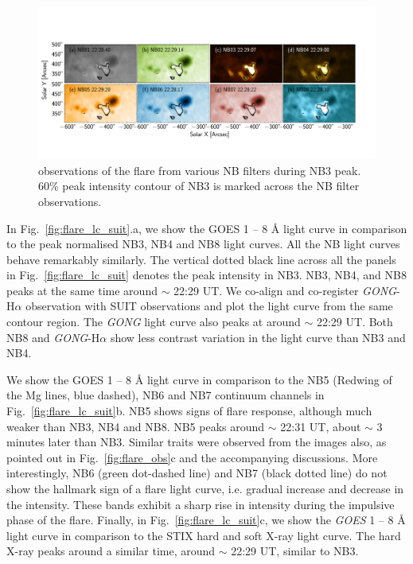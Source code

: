 \begin{figure}
    \centering
    \includegraphics[trim={0.2cm 2.5cm 2cm 4cm},clip,width=\linewidth]{Figures/feb_22nd/suit_roi_nb3_peak.pdf}
    \caption[{\suit} observations of the flare from various NB filters during NB3 peak]{{\suit} observations of the flare from various NB filters during NB3 peak. 60\% peak intensity contour of NB3 is marked across the NB filter observations.}
    \label{fig:flare_nb3_peak}
\end{figure}

In Fig.~\ref{fig:flare_lc_suit}.a, we show the GOES 1 {--} 8 {\AA} light curve in comparison to the peak normalised NB3, NB4 and NB8 light curves. All the NB light curves behave remarkably similarly. The vertical dotted black line across all the panels in Fig.~\ref{fig:flare_lc_suit} denotes the peak intensity in NB3. NB3, NB4, and NB8 peaks at the same time around $\sim$ 22:29 UT. We co-align and co-register {\it GONG}-H$\alpha$ observation with SUIT observations and plot the light curve from the same contour region. The {\it GONG} light curve also peaks at around $\sim$ 22:29 UT. Both NB8 and {\it GONG}-H$\alpha$ show less contrast variation in the light curve than NB3 and NB4.

We show the GOES 1 {--} 8 {\AA} light curve in comparison to the NB5 (Redwing of the Mg lines, blue dashed), NB6 and NB7 continuum channels in Fig.~\ref{fig:flare_lc_suit}b. NB5 shows signs of flare response, although much weaker than NB3, NB4 and NB8. NB5 peaks around $\sim$ 22:31 UT, about $\sim$ 3 minutes later than NB3. Similar traits were observed from the images also, as pointed out in Fig.~\ref{fig:flare_obs}c and the accompanying discussions. More interestingly, NB6 (green dot-dashed line) and NB7 (black dotted line) do not show the hallmark sign of a flare light curve, i.e. gradual increase and decrease in the intensity. These bands exhibit a sharp rise in intensity during the impulsive phase of the flare. Finally, in Fig.~\ref{fig:flare_lc_suit}c, we show the {\it GOES} 1 {--} 8 {\AA} light curve in comparison to the STIX hard and soft X-ray light curve. The hard X-ray peaks around a similar time, around $\sim$ 22:29 UT, similar to NB3.

